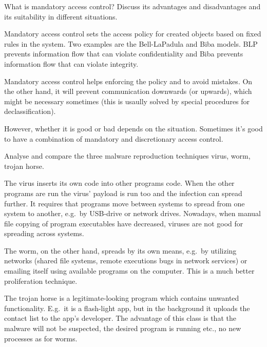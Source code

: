   
\question[3]
What is mandatory access control?
Discuss its advantages and disadvantages and its suitability in different 
situations.

\begin{solution}
  Mandatory access control sets the access policy for created objects based on 
  fixed rules in the system.
  Two examples are the Bell-LaPadula and Biba models.
  BLP prevents information flow that can violate confidentiality and Biba 
  prevents information flow that can violate integrity.

  Mandatory access control helps enforcing the policy and to avoid mistakes.
  On the other hand, it will prevent communication downwards (or upwards), 
  which might be necessary sometimes (this is usaully solved by special 
  procedures for declassification).

  However, whether it is good or bad depends on the situation.
  Sometimes it's good to have a combination of mandatory and discretionary 
  access control.
\end{solution}


\question[3]
  Analyse and compare the three malware reproduction techniques
  virus,
  worm,
  trojan horse.

  \begin{solution}
    The virus inserts its own code into other programs code.
    When the other programs are run the virus' payload is run too and the 
    infection can spread further.
    It requires that programs move between systems to spread from one system to 
    another, e.g.\ by USB-drive or network drives.
    Nowadays, when manual file copying of program executables have decreased, 
    viruses are not good for spreading across systems.

    The worm, on the other hand, spreads by its own means, e.g.\ by utilizing 
    networks (shared file systems, remote executions bugs in network services) 
    or emailing itself using available programs on the computer.
    This is a much better proliferation technique.

    The trojan horse is a legitimate-looking program which contains unwanted 
    functionality.
    E.g.\ it is a flash-light app, but in the background it uploads the contact 
    list to the app's developer.
    The advantage of this class is that the malware will not be suspected, the 
    desired program is running etc., no new processes as for worms.
  \end{solution}




